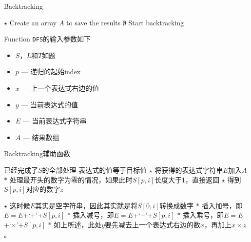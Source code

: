 \setcounter{algorithm}{0}
\begin{algorithm}[H]
\caption{Backtracking}
\begin{algorithmic}[1]
\State $\star$ Create an array $A$ to save the results
\State \Return $\emptyset$
\EndIf
\State {} \Comment Start backtracking
\EndProcedure
\end{algorithmic}
\end{algorithm}
Function \texttt{DFS}的输入参数如下
\begin{itemize}
\item $S$，$L$和$T$如题
\item $p$ --- 递归的起始index
\item $x$ --- 上一个表达式右边的值
\item $y$ --- 当前表达式的值
\item $E$ --- 当前表达式字符串
\item $A$ --- 结果数组
\end{itemize}
\begin{algorithm}[H]
\caption{Backtracking辅助函数}
\begin{algorithmic}[1]
 \Comment 已经完成了$S$的全部处理
 \Comment 表达式的值等于目标值
\State $\star$ 将获得的表达式字符串$E$加入$A$
\EndIf
\State \Return
\EndIf
{}
\State $\ast$ 处理最开头的数字为零的情况，如果此时$S[p,i]$长度大于1，直接返回
\State \Return 
\EndIf
\State $\star$ 得到$S[p, i]$对应的数字$z$
\end{algorithmic}
\end{algorithm}
\begin{algorithm}[H]
\begin{algorithmic}[1]
\State $\star$ 这时候$E$其实是空字符串，因此其实就是将$S[0,i]$转换成数字
\State {}
\Else
\State $\ast$ 插入加号，即$E=E$+`$+$'+$S[p,i]$
\State {}
\State $\ast$ 插入减号，即$E=E$+`$-$'+$S[p,i]$
\State {}
\State $\ast$ 插入乘号，即$E=E$+`$\times$'+$S[p,i]$
\State $\ast$ 如上所述，此处$y$要先减去上一个表达式右边的数$x$，再加上$x\times z$。
\State {} \Comment 
\EndIf
\EndFor
\EndProcedure
\end{algorithmic}
\end{algorithm}

